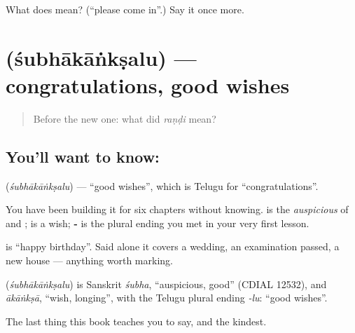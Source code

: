 \begin{tcolorbox}[breakable,colback=teal!4,colframe=teal!35!black,title={Before you move on}]
What does   mean? (\textquotedblleft{}please come in\textquotedblright{}.) Say it once more.
\end{tcolorbox}
\section[\texorpdfstring{\te{శుభాకాంక్షలు} (śubhākāṅkṣalu)}{శుభాకాంక్షలు (śubhākāṅkṣalu)}]{ (śubhākāṅkṣalu) — congratulations, good wishes}

\label{lesson:TE-C80-congratulations}



\begin{quote}
Before the new one: what did \emph{raṇḍi} mean?
\end{quote}

\subsection*{You'll want to know: }
\textbf{} (\emph{śubhākāṅkṣalu}) — \textquotedblleft{}good wishes\textquotedblright{}, which is Telugu for \textquotedblleft{}congratulations\textquotedblright{}.

You have been building it for six chapters without knowing. \textbf{} is the \emph{auspicious} of  and  ; \textbf{} is a wish; \textbf{-} is the plural ending you met in your very first lesson.

\textbf{ } is \textquotedblleft{}happy birthday\textquotedblright{}. Said alone it covers a wedding, an examination passed, a new house — anything worth marking.

\begin{cousinweb}
\textbf{} (\emph{śubhākāṅkṣalu}) is Sanskrit \emph{śubha}, \textquotedblleft{}auspicious, good\textquotedblright{} (CDIAL 12532), and \emph{ākāṅkṣā}, \textquotedblleft{}wish, longing\textquotedblright{}, with the Telugu plural ending \emph{-lu}: \textquotedblleft{}good wishes\textquotedblright{}.
\end{cousinweb}

\begin{grammarlens}[title={What you've built}]
The last thing this book teaches you to say, and the kindest.
\end{grammarlens}

